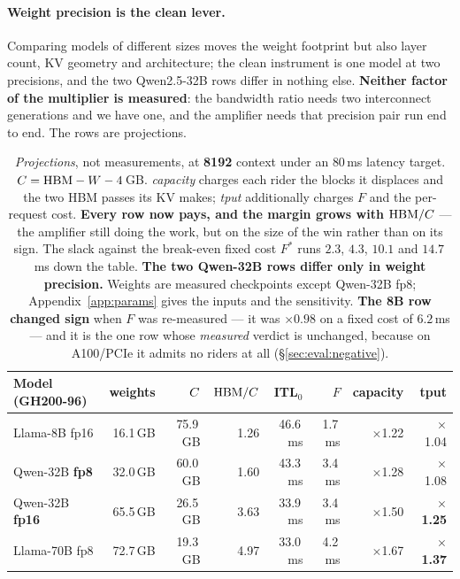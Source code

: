 \paragraph{Weight precision is the clean lever.} Comparing models of different
sizes moves the weight footprint but also layer count, KV geometry and
architecture; the clean instrument is one model at two precisions, and the two
Qwen2.5-32B rows differ in nothing else. \textbf{Neither factor of the multiplier
is measured}: the bandwidth ratio needs two interconnect generations and we have
one, and the amplifier needs that precision pair run end to end. The rows are
projections.

\begin{table}[t]
\centering
\small
\begin{tabular}{lrrrrrrr}
\toprule
Model (GH200-96) & weights & $C$ & $\mathrm{HBM}/C$ & ITL$_0$ & $F$ & capacity & tput \\
\midrule
Llama-8B fp16          & 16.1\,GB & 75.9\,GB & 1.26 & 46.6\,ms & \phantom{0}1.7\,ms & $\times$1.22 & $\times$1.04 \\
Qwen-32B \textbf{fp8}  & 32.0\,GB & 60.0\,GB & 1.60 & 43.3\,ms & \phantom{0}3.4\,ms & $\times$1.28 & $\times$1.08 \\
Qwen-32B \textbf{fp16} & 65.5\,GB & 26.5\,GB & 3.63 & 33.9\,ms & \phantom{0}3.4\,ms & $\times$1.50 & $\times$\textbf{1.25} \\
Llama-70B fp8          & 72.7\,GB & 19.3\,GB & 4.97 & 33.0\,ms & \phantom{0}4.2\,ms & $\times$1.67 & $\times$\textbf{1.37} \\
\bottomrule
\end{tabular}
\caption{\emph{Projections}, not measurements, at \textbf{8192} context under an
$80$\,ms latency target.
$C = \mathrm{HBM} - W - 4$\,GB. \emph{capacity} charges each rider the blocks it
displaces and the two HBM passes its KV makes; \emph{tput} additionally charges $F$
and the per-request cost. \textbf{Every row now pays, and the margin grows with
$\mathrm{HBM}/C$} --- the amplifier still doing the work, but on the size of the win
rather than on its sign. The slack against the break-even fixed cost $F^{*}$ runs
$2.3$, $4.3$, $10.1$ and $14.7$\,ms down the table.
\textbf{The two Qwen-32B rows differ only in weight precision.} Weights are
measured checkpoints except Qwen-32B fp8; Appendix~\ref{app:params} gives the
inputs and the sensitivity.
\textbf{The 8B row changed sign} when $F$ was re-measured --- it was
$\times 0.98$ on a fixed cost of $6.2$\,ms --- and it is the one row whose
\emph{measured} verdict is unchanged, because on A100/PCIe it admits no riders at
all (\S\ref{sec:eval:negative}).}
\label{tab:gain}
\end{table}

